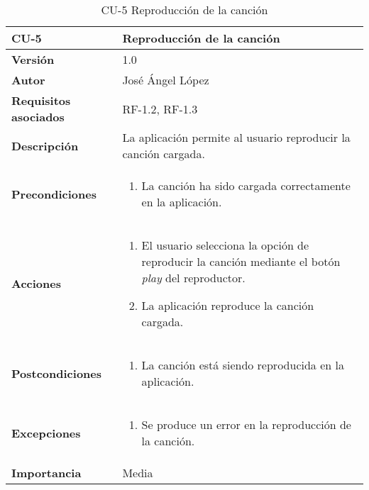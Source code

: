 \begin{table}[p]
	\centering
	\begin{tabularx}{\linewidth}{ p{} p{} }
		\toprule
		\textbf{CU-5}    & \textbf{Reproducción de la canción}\\
		\toprule
		\textbf{Versión}              & 1.0    \\
		\textbf{Autor}                & José Ángel López \\
		\textbf{Requisitos asociados} & RF-1.2, RF-1.3 \\
		\textbf{Descripción}          & La aplicación permite al usuario reproducir la canción cargada. \\
		\textbf{Precondiciones}        & 
		\begin{enumerate}		    
			\def\labelenumi{\arabic{enumi}.}
			\tightlist
			\item La canción ha sido cargada correctamente en la aplicación.
		\end{enumerate}\\
		\textbf{Acciones}             &
		\begin{enumerate}
			\def\labelenumi{\arabic{enumi}.}
			\tightlist
			\item El usuario selecciona la opción de reproducir la canción mediante el botón \textit{play} del reproductor.
			\item La aplicación reproduce la canción cargada.
		\end{enumerate}\\
		\textbf{Postcondiciones} &
		\begin{enumerate}
			\def\labelenumi{\arabic{enumi}.}
			\tightlist
			\item La canción está siendo reproducida en la aplicación.
		\end{enumerate}\\
		\textbf{Excepciones} &
		\begin{enumerate}
			\def\labelenumi{\arabic{enumi}.}
			\tightlist
			\item Se produce un error en la reproducción de la canción.
		\end{enumerate}\\
		\textbf{Importancia}          & Media \\
		\bottomrule
	\end{tabularx}
	\caption{CU-5 Reproducción de la canción}
\end{table}

